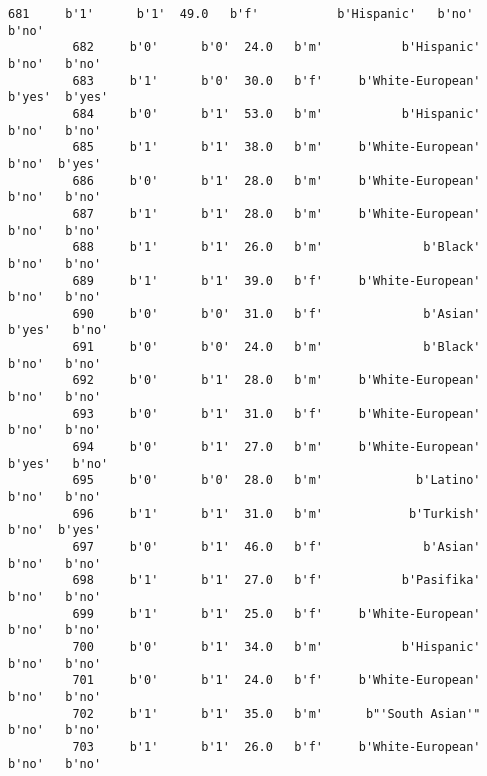 \documentclass[11pt]{article}
\begin{document}
\begin{Verbatim}[commandchars=\\\{\}]
         681     b'1'      b'1'  49.0   b'f'           b'Hispanic'   b'no'   b'no'   
         682     b'0'      b'0'  24.0   b'm'           b'Hispanic'   b'no'   b'no'   
         683     b'1'      b'0'  30.0   b'f'     b'White-European'  b'yes'  b'yes'   
         684     b'0'      b'1'  53.0   b'm'           b'Hispanic'   b'no'   b'no'   
         685     b'1'      b'1'  38.0   b'm'     b'White-European'   b'no'  b'yes'   
         686     b'0'      b'1'  28.0   b'm'     b'White-European'   b'no'   b'no'   
         687     b'1'      b'1'  28.0   b'm'     b'White-European'   b'no'   b'no'   
         688     b'1'      b'1'  26.0   b'm'              b'Black'   b'no'   b'no'   
         689     b'1'      b'1'  39.0   b'f'     b'White-European'   b'no'   b'no'   
         690     b'0'      b'0'  31.0   b'f'              b'Asian'  b'yes'   b'no'   
         691     b'0'      b'0'  24.0   b'm'              b'Black'   b'no'   b'no'   
         692     b'0'      b'1'  28.0   b'm'     b'White-European'   b'no'   b'no'   
         693     b'0'      b'1'  31.0   b'f'     b'White-European'   b'no'   b'no'   
         694     b'0'      b'1'  27.0   b'm'     b'White-European'  b'yes'   b'no'   
         695     b'0'      b'0'  28.0   b'm'             b'Latino'   b'no'   b'no'   
         696     b'1'      b'1'  31.0   b'm'            b'Turkish'   b'no'  b'yes'   
         697     b'0'      b'1'  46.0   b'f'              b'Asian'   b'no'   b'no'   
         698     b'1'      b'1'  27.0   b'f'           b'Pasifika'   b'no'   b'no'   
         699     b'1'      b'1'  25.0   b'f'     b'White-European'   b'no'   b'no'   
         700     b'0'      b'1'  34.0   b'm'           b'Hispanic'   b'no'   b'no'   
         701     b'0'      b'1'  24.0   b'f'     b'White-European'   b'no'   b'no'   
         702     b'1'      b'1'  35.0   b'm'      b"'South Asian'"   b'no'   b'no'   
         703     b'1'      b'1'  26.0   b'f'     b'White-European'   b'no'   b'no'   
         

\end{Verbatim}
\end{document}
